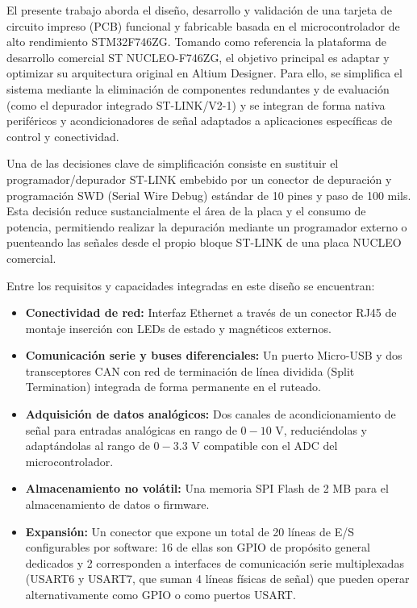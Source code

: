 \documentclass[12pt,a4paper]{article}
\begin{document}
El presente trabajo aborda el diseño, desarrollo y validación de una tarjeta de circuito impreso (PCB) funcional y fabricable basada en el microcontrolador de alto rendimiento STM32F746ZG. Tomando como referencia la plataforma de desarrollo comercial ST NUCLEO-F746ZG, el objetivo principal es adaptar y optimizar su arquitectura original en Altium Designer. Para ello, se simplifica el sistema mediante la eliminación de componentes redundantes y de evaluación (como el depurador integrado ST-LINK/V2-1) y se integran de forma nativa periféricos y acondicionadores de señal adaptados a aplicaciones específicas de control y conectividad.

Una de las decisiones clave de simplificación consiste en sustituir el programador/depurador ST-LINK embebido por un conector de depuración y programación SWD (Serial Wire Debug) estándar de 10 pines y paso de 100 mils. Esta decisión reduce sustancialmente el área de la placa y el consumo de potencia, permitiendo realizar la depuración mediante un programador externo o puenteando las señales desde el propio bloque ST-LINK de una placa NUCLEO comercial.

Entre los requisitos y capacidades integradas en este diseño se encuentran:
\begin{itemize}
    \item \textbf{Conectividad de red:} Interfaz Ethernet a través de un conector RJ45 de montaje inserción con LEDs de estado y magnéticos externos.
    \item \textbf{Comunicación serie y buses diferenciales:} Un puerto Micro-USB y dos transceptores CAN con red de terminación de línea dividida (Split Termination) integrada de forma permanente en el ruteado.
    \item \textbf{Adquisición de datos analógicos:} Dos canales de acondicionamiento de señal para entradas analógicas en rango de $0-10\text{ V}$, reduciéndolas y adaptándolas al rango de $0-3.3\text{ V}$ compatible con el ADC del microcontrolador.
    \item \textbf{Almacenamiento no volátil:} Una memoria SPI Flash de 2 MB para el almacenamiento de datos o firmware.
    \item \textbf{Expansión:} Un conector que expone un total de 20 líneas de E/S configurables por software: 16 de ellas son GPIO de propósito general dedicados y 2 corresponden a interfaces de comunicación serie multiplexadas (USART6 y USART7, que suman 4 líneas físicas de señal) que pueden operar alternativamente como GPIO o como puertos USART.
\end{itemize}
\end{document}
